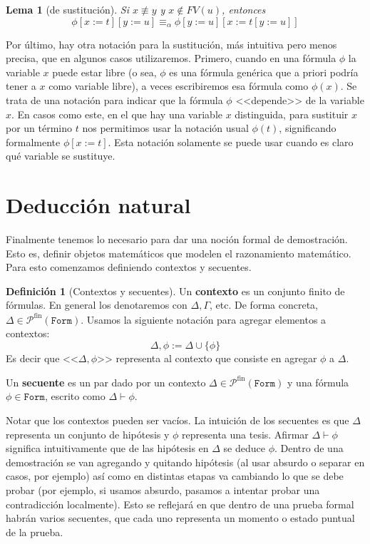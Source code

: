 \documentclass[a4paper, 12pt]{report}
\newcommand{\te}{\text}
\newtheorem{lema}[teorema]{Lema}
\theoremstyle{definition}
\newtheorem{definicion}[teorema]{Definición}
\begin{document}
\begin{lema}[de sustitución]
	Si $x\not\equiv y$ y $x\not\in FV(u)$, entonces
	$$\phi[x:=t][y:=u]\equiv_\alpha \phi[y:=u][x:=t[y:=u]]
	$$
\end{lema}

Por último, hay otra notación para la sustitución, más intuitiva pero menos precisa, que en algunos casos utilizaremos. Primero, cuando en una fórmula $\phi$ la variable $x$ puede estar libre (o sea, $\phi$ es una fórmula genérica que a priori podría tener a $x$ como variable libre), a veces escribiremos esa fórmula como $\phi(x)$. Se trata de una notación para indicar que la fórmula $\phi$ <<depende>> de la variable $x$. En casos como este, en el que hay una variable $x$ distinguida, para sustituir $x$ por un término $t$ nos permitimos usar la notación usual $\phi(t)$, significando formalmente $\phi[x:=t]$. Esta notación solamente se puede usar cuando es claro qué variable se sustituye.

\section{Deducción natural}

Finalmente tenemos lo necesario para dar una noción formal de demostración. Esto es, definir objetos matemáticos que modelen el razonamiento matemático. Para esto comenzamos definiendo contextos y secuentes.

\begin{definicion}[Contextos y secuentes]
	Un \textbf{contexto} es un conjunto finito de fórmulas. En general los denotaremos con $\Delta,\Gamma$, etc. De forma concreta, $\Delta\in\mathcal{P}^{\te{fin}}(\mathtt{Form})$. Usamos la siguiente notación para agregar elementos a contextos:
	$$ \Delta,\phi:= \Delta\cup\{\phi\} $$
	Es decir que  <<$\Delta,\phi$>> representa al contexto que consiste en agregar $\phi$ a $\Delta$.
	
	Un \textbf{secuente} es un par dado por un contexto $\Delta\in\mathcal{P}^{\te{fin}}(\mathtt{Form})$ y una fórmula $\phi\in\mathtt{Form}$, escrito como $\Delta\vdash\phi$.
\end{definicion}

Notar que los contextos pueden ser vacíos. La intuición de los secuentes es que $\Delta$ representa un conjunto de hipótesis y $\phi$ representa una tesis. Afirmar $\Delta\vdash\phi$ significa intuitivamente que de las hipótesis en $\Delta$ se deduce $\phi$. Dentro de una demostración se van agregando y quitando hipótesis (al usar absurdo o separar en casos, por ejemplo) así como en distintas etapas va cambiando lo que se debe probar (por ejemplo, si usamos absurdo, pasamos a intentar probar una contradicción localmente). Esto se reflejará en que dentro de una prueba formal habrán varios secuentes, que cada uno representa un momento o estado puntual de la prueba.
\end{document}
